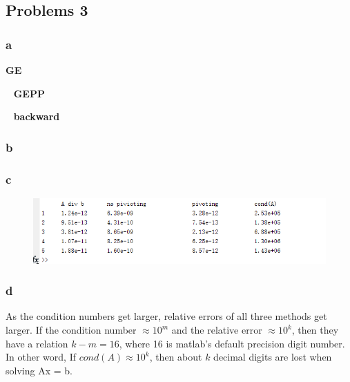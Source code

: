 \documentclass[11pt,fleqn]{exam}
\begin{document}
\subsection*{Problems 3}
\subsubsection*{a}
\textbf{GE}


~\newline
\textbf{GEPP}


~\newline
\textbf{backward}


\subsubsection*{b}


\subsubsection*{c}
\begin{figure}[hbt!]
  	\centering
  	\includegraphics[width=1.0\textwidth]{q3_c}
\end{figure}

\subsubsection*{d}
As the condition numbers get larger, relative errors of all three methods get larger. If the condition number $\approx 10^m$ and the relative error $\approx 10^k$, then they have a relation $k - m = 16$, where 16 is matlab's default precision digit number. In other word, If $cond(A) \approx 10^k$, then about $k$ decimal digits are lost when solving Ax = b. 

\newpage
\end{document}
